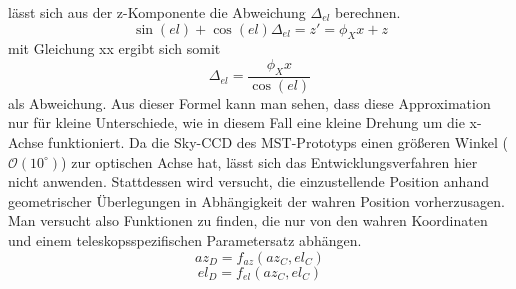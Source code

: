 lässt sich aus der z-Komponente die Abweichung $\Delta_{el}$ berechnen.
\begin{equation}
\sin(el)+\cos(el)\Delta_{el}=z\prime=\phi_Xx+z
\end{equation}
mit Gleichung xx ergibt sich somit 
\begin{equation}
\Delta_{el}=\frac{\phi_Xx}{\cos(el)}
\end{equation}
als Abweichung. Aus dieser Formel kann man sehen, dass diese Approximation nur für kleine Unterschiede, wie in diesem Fall eine kleine Drehung um die x-Achse funktioniert.
Da die Sky-CCD des MST-Prototyps einen größeren Winkel ($\mathcal{O}\left(10^{\circ}\right)$) zur optischen Achse hat, lässt sich das Entwicklungsverfahren hier nicht anwenden. Stattdessen wird versucht, die einzustellende Position anhand geometrischer Überlegungen in Abhängigkeit der wahren Position vorherzusagen. Man versucht also Funktionen zu finden, die nur von den wahren Koordinaten und einem teleskopsspezifischen Parametersatz abhängen.
\begin{equation} 
az_D=f_{az}(az_C,el_C)
\end{equation}
\begin{equation}
el_D=f_{el}(az_C,el_C)
\label{eq:pointingprinciple}
\end{equation}

